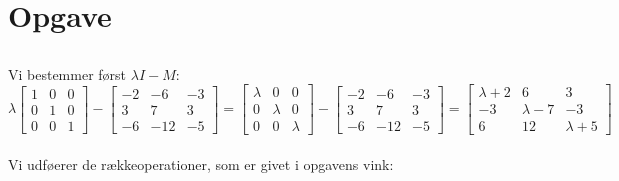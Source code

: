 \documentclass[a4paper,12pt]{article}
\begin{document}
\subsection{}


\subsection{}


\subsection{}


\section[Opgave]{Opgave}
\subsection{}

Vi bestemmer først $\lambda I - M$:
\[
\lambda
\left[\begin{array}{ccc}
    1 & 0 & 0\\
    0 & 1 & 0 \\
    0 & 0 & 1
\end{array}\right]
-
\left[\begin{array}{ccc}
    -2 & -6 & -3\\
    3 & 7 & 3 \\
    -6 & -12 & -5
\end{array}\right]
=
\left[\begin{array}{ccc}
    \lambda & 0 & 0\\
    0 & \lambda & 0 \\
    0 & 0 & \lambda
\end{array}\right]
-
\left[\begin{array}{ccc}
    -2 & -6 & -3\\
    3 & 7 & 3 \\
    -6 & -12 & -5
\end{array}\right]
=
\left[\begin{array}{ccc}
    \lambda+2 & 6 & 3\\
    -3 & \lambda-7 & -3 \\
    6 & 12 & \lambda+5
\end{array}\right]
\]\\

Vi udføerer de rækkeoperationer, som er givet i opgavens vink:\\
\end{document}
